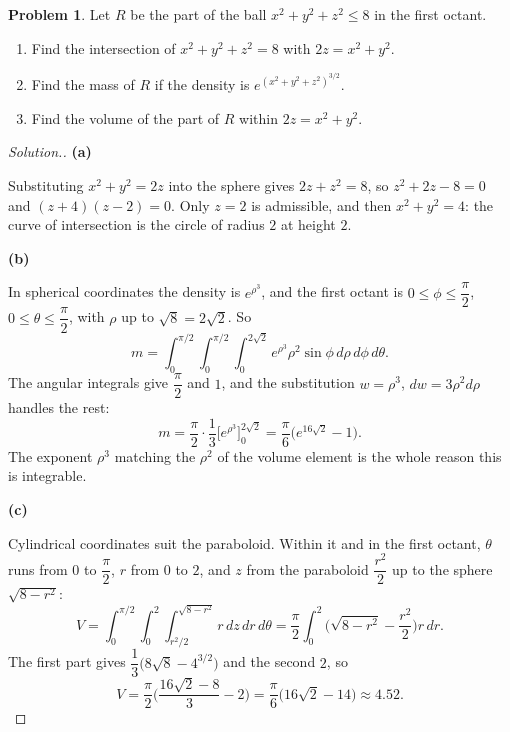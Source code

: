 \documentclass[11pt,a4paper]{article}
\theoremstyle{definition}
\newtheorem{problemx}{Problem}[subsection]
\newenvironment{problem}{\begin{problemx}}{\end{problemx}}
\newenvironment{solution}
  {\renewcommand{\qedsymbol}{}\begin{proof}[\textit{Solution}.]}
  {\end{proof}}
\newcommand{\subhead}[1]{%
  \par\medskip\noindent\textbf{#1}\par\nobreak\smallskip}
\begin{document}
\begin{problem}
Let $R$ be the part of the ball $x^2+y^2+z^2\leq 8$ in the first octant.
\begin{enumerate}
\item[(a)] Find the intersection of $x^2+y^2+z^2 = 8$ with $2z = x^2+y^2$.
\item[(b)] Find the mass of $R$ if the density is
$e^{(x^2+y^2+z^2)^{3/2}}$.
\item[(c)] Find the volume of the part of $R$ within $2z = x^2+y^2$.
\end{enumerate}
\end{problem}
\begin{solution}
\subhead{(a)}
Substituting $x^2+y^2 = 2z$ into the sphere gives $2z+z^2 = 8$, so
$z^2+2z-8 = 0$ and $(z+4)(z-2) = 0$. Only $z=2$ is admissible, and then
$x^2+y^2 = 4$: the curve of intersection is the circle of radius $2$ at height
$2$.

\subhead{(b)}
In spherical coordinates the density is $e^{\rho^3}$, and the first octant is
$0\leq\phi\leq\dfrac{\pi}{2}$, $0\leq\theta\leq\dfrac{\pi}{2}$, with
$\rho$ up to $\sqrt8 = 2\sqrt2$. So
$$m = \int_0^{\pi/2}\int_0^{\pi/2}\int_0^{2\sqrt2}
e^{\rho^3}\rho^2\sin\phi\,d\rho\,d\phi\,d\theta .$$
The angular integrals give $\dfrac{\pi}{2}$ and $1$, and the substitution
$w = \rho^3$, $dw = 3\rho^2d\rho$ handles the rest:
$$m = \frac{\pi}{2}\cdot\frac13\Big[e^{\rho^3}\Big]_0^{2\sqrt2}
= \frac{\pi}{6}\Big(e^{16\sqrt2}-1\Big).$$
The exponent $\rho^3$ matching the $\rho^2$ of the volume element is the whole
reason this is integrable.

\subhead{(c)}
Cylindrical coordinates suit the paraboloid. Within it and in the first octant,
$\theta$ runs from $0$ to $\dfrac{\pi}{2}$, $r$ from $0$ to $2$, and $z$ from
the paraboloid $\dfrac{r^2}{2}$ up to the sphere $\sqrt{8-r^2}$:
$$V = \int_0^{\pi/2}\int_0^2\int_{r^2/2}^{\sqrt{8-r^2}}r\,dz\,dr\,d\theta
= \frac{\pi}{2}\int_0^2\Big(\sqrt{8-r^2}-\frac{r^2}{2}\Big)r\,dr .$$
The first part gives $\dfrac13\big(8\sqrt8 - 4^{3/2}\big)$ and the second
$2$, so
$$V = \frac{\pi}{2}\Big(\frac{16\sqrt2-8}{3} - 2\Big)
= \frac{\pi}{6}\Big(16\sqrt2 - 14\Big)\approx 4.52 .$$
\end{solution}
\end{document}
